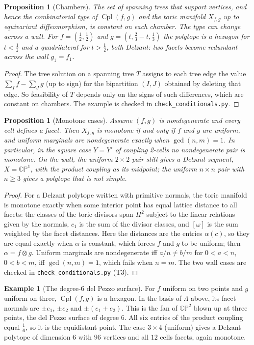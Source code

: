 \documentclass[11pt]{article}
\newtheorem{proposition}[theorem]{Proposition}
\theoremstyle{definition}
\newtheorem{example}[theorem]{Example}
\theoremstyle{remark}
\newcommand{\Cpl}{\operatorname{Cpl}}
\begin{document}
\begin{proposition}[Chambers]\label{prop:chambers}
The set of spanning trees that support vertices, and hence the combinatorial type of $\Cpl(f,g)$ and
the toric manifold $X_{f,g}$ up to equivariant diffeomorphism, is constant on each chamber. The type
can change across a wall. For $f=(\tfrac12,\tfrac12)$ and $g=(t,\tfrac23-t,\tfrac13)$ the polytope is a
hexagon for $t<\tfrac12$ and a quadrilateral for $t>\tfrac12$, both Delzant: two facets become redundant
across the wall $g_1=f_1$.
\end{proposition}
\begin{proof}
The tree solution on a spanning tree $T$ assigns to each tree edge the value $\sum_If-\sum_Jg$ (up to
sign) for the bipartition $(I,J)$ obtained by deleting that edge. So feasibility of $T$ depends only on
the signs of such differences, which are constant on chambers. The example is checked in
\texttt{check\_conditionals.py}.
\end{proof}

\begin{proposition}[Monotone cases]\label{prop:monotone}
Assume $(f,g)$ is nondegenerate and every cell defines a facet. Then $X_{f,g}$ is monotone if and only
if $f$ and $g$ are uniform, and uniform marginals are nondegenerate exactly when $\gcd(n,m)=1$. In
particular, in the square case $Y=Y'$ of coupling 2-cells no nondegenerate pair is monotone. On the
wall, the uniform $2\times2$ pair still gives a Delzant segment, $X=\mathbb{CP}^1$, with the product
coupling as its midpoint; the uniform $n\times n$ pair with $n\ge3$ gives a polytope that is not simple.
\end{proposition}
\begin{proof}
For a Delzant polytope written with primitive normals, the toric manifold is monotone exactly when
some interior point has equal lattice distance to all facets: the classes of the toric divisors span
$H^2$ subject to the linear relations given by the normals, $c_1$ is the sum of the divisor classes, and
$[\omega]$ is the sum weighted by the facet distances. Here the distances are the entries
$\alpha(c)$, so they are equal exactly when $\alpha$ is constant, which forces $f$ and $g$ to be
uniform; then $\alpha=f\otimes g$. Uniform marginals are nondegenerate iff $a/n\ne b/m$ for
$0<a<n$, $0<b<m$, iff $\gcd(n,m)=1$, which fails when $n=m$. The two wall cases are checked in
\texttt{check\_conditionals.py} (T3).
\end{proof}

\begin{example}[The degree-6 del Pezzo surface]\label{ex:dp6}
For $f$ uniform on two points and $g$ uniform on three, $\Cpl(f,g)$ is a hexagon. In the basis of
$\Lambda$ above, its facet normals are $\pm e_1$, $\pm e_2$ and $\pm(e_1+e_2)$. This is the fan of
$\mathbb{CP}^2$ blown up at three points, the del Pezzo surface of degree $6$. All six entries of the
product coupling equal $\tfrac16$, so it is the equidistant point. The case $3\times4$ (uniform) gives a
Delzant polytope of dimension $6$ with $96$ vertices and all $12$ cells facets, again monotone.
\end{example}
\end{document}
